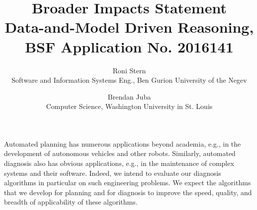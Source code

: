 \documentclass[12pt]{article}
\begin{document}
\title{Broader Impacts Statement \\ \Large{Data-and-Model Driven Reasoning, BSF Application No. 2016141}}
\date{\vspace{-0.5cm}}
\author{Roni Stern \\ Software and Information Systems Eng., Ben Gurion University of the Negev
        \and Brendan Juba \\ Computer Science, Washington University in St. Louis}



\maketitle



Automated planning has numerous applications beyond academia, e.g., in the development of autonomous vehicles and other robots. Similarly, automated diagnosis also has obvious applications, e.g., in the maintenance of complex systems and their software. Indeed, we intend to evaluate our diagnosis algorithms in particular on such engineering problems. %
We expect the algorithms that we develop for planning and for diagnosis to improve the speed, quality, and breadth of applicability of these algorithms. 
\end{document}
